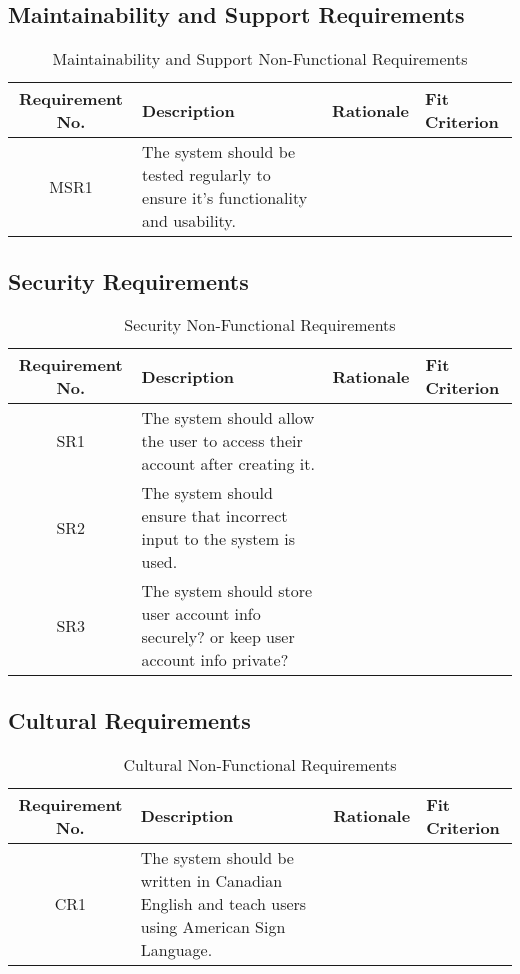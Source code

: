 \documentclass[12pt, titlepage]{article}
\begin{document}
\subsection{Maintainability and Support Requirements}


\begin{table}[H]
\caption{Maintainability and Support Non-Functional Requirements}
\noindent \begin{tabular}{| c | p{3cm}| p{3cm}| p{3cm}|}
\toprule 
\textbf{Requirement No.} & \textbf{Description} & \textbf{Rationale} & \textbf{Fit Criterion}\\
\midrule
MSR1 & The system should be tested regularly to ensure it's functionality and usability. & & \\
\bottomrule
\end{tabular}
\end{table}

\subsection{Security Requirements}

\begin{table}[H]
\caption{Security Non-Functional Requirements}
\noindent \begin{tabular}{| c | p{3cm}| p{3cm}| p{3cm}|}
\toprule 
\textbf{Requirement No.} & \textbf{Description} & \textbf{Rationale} & \textbf{Fit Criterion}\\
\midrule
SR1 & The system should allow the user to access their account after creating it. & & \\
\hline
SR2 & The system should ensure that incorrect input to the system is used. & & \\
\hline
SR3 & The system should store user account info securely? or keep user account info private? & & \\
\bottomrule
\end{tabular}
\end{table}

\subsection{Cultural Requirements}

\begin{table}[H]
\caption{Cultural Non-Functional Requirements}
\noindent \begin{tabular}{| c | p{3cm}| p{3cm}| p{3cm}|}
\toprule 
\textbf{Requirement No.} & \textbf{Description} & \textbf{Rationale} & \textbf{Fit Criterion}\\
\midrule
CR1 & The system should be written in Canadian English and teach users using American Sign Language.  & & \\
\bottomrule
\end{tabular}
\end{table}
\end{document}
